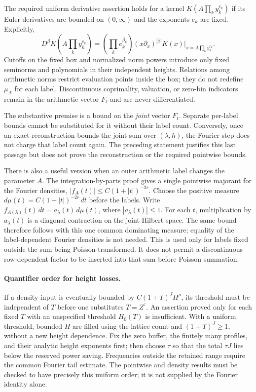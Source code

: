 The required uniform derivative assertion holds for a kernel
$K(A\prod_k y_k^{e_k})$ if its Euler derivatives are bounded on
$(0,\infty)$ and the exponents $e_k$ are fixed. Explicitly,
\[
 D^\beta K\left(A\prod_k y_k^{e_k}\right)
   =\left(\prod_k e_k^{\beta_k}\right)
     (x\partial_x)^{|\beta|}K(x)
       \bigg|_{x=A\prod_k y_k^{e_k}}.
\]
Cutoffs on the fixed box and normalized norm powers introduce only
fixed seminorms and polynomials in their independent heights.
Relations among arithmetic norms restrict evaluation points inside
the box; they do not redefine $\mu_A$ for each label. Discontinuous
coprimality, valuation, or zero-bin indicators remain in the arithmetic
vector $F_t$ and are never differentiated.

The substantive premise is a bound on the \emph{joint} vector $F_t$.
Separate per-label bounds cannot be substituted for it without their
label count. Conversely, once an exact reconstruction bounds the joint
sum over $(\lambda,h)$, the Fourier step does not charge that label
count again. The preceding statement justifies this last passage but
does not prove the reconstruction or the required pointwise bounds.

There is also a useful version when an outer arithmetic label changes
the parameter $A$. The integration-by-parts proof gives a single
pointwise majorant for the Fourier densities,
$|f_A(t)|\leq C(1+|t|)^{-2r}$. Choose the positive measure
$d\mu(t)=C(1+|t|)^{-2r}\,dt$ before the labels. Write
$f_{A(\lambda)}(t)\,dt=a_\lambda(t)\,d\mu(t)$, where
$|a_\lambda(t)|\leq1$. For each $t$, multiplication by
$a_\lambda(t)$ is a diagonal contraction on the joint Hilbert space.
The same bound therefore follows with this one common dominating
measure; equality of the label-dependent Fourier densities is not
needed. This is used only for labels fixed outside the sum being
Poisson-transformed. It does not permit a discontinuous row-dependent
factor to be inserted into that sum before Poisson summation.

\paragraph{Quantifier order for height losses.}
If a density input is eventually bounded by
$C(1+T)^J H^\rho$, its threshold must be independent of $T$ before
one substitutes $T=Z^\tau$. An assertion proved only for each fixed
$T$ with an unspecified threshold $H_0(T)$ is insufficient. With a
uniform threshold, bounded $H$ are filled using the lattice count and
$(1+T)^J\geq1$, without a new height dependence. Fix the zero buffer,
the finitely many profiles, and their analytic height exponents first;
then choose $\tau$ so that the total $\tau J$ lies below the reserved
power saving. Frequencies outside the retained range require the
common Fourier tail estimate. The pointwise and density results must
be checked to have precisely this uniform order; it is not supplied
by the Fourier identity alone.
